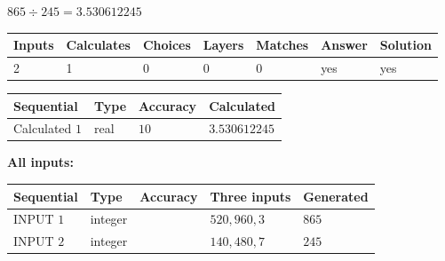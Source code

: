 \documentclass{ctexart}
\begin{document}
 

$ %
865 \div  %
245=   %
3.530612245$
 
 
\noindent{}
 
 

 
   
   
   
   
\noindent\begin{tabular}{|l|l|l|l|l|l|l|}
 \hline
Inputs & Calculates & Choices & Layers & Matches & Answer & Solution \\ \hline
 2  & 
 1  & 
 0
  & 
 0  & 
 0  & 
  yes & 
  yes 
  \\ \hline
 \end{tabular}
   
   
   
   
\noindent{}
   
   
  
  
\noindent\begin{tabular}{|l|l|l|l|}
\hline
 Sequential & Type & Accuracy & Calculated \\ 
\hline
 
 
  Calculated $  1 $ & real & $  10  $ & 
 $ 3.530612245 $ 
 \\  \hline  
 \end{tabular}
   
   
   
   
\noindent\vspace{0.1in}\hspace{-0.08in} {\textbf{\Large{All inputs: }}}
   
   
  
  
\noindent\begin{tabular}{|l|l|l|l|l|}
\hline
 Sequential & Type & Accuracy & Three inputs & Generated \\ 
\hline
 
 
  INPUT $  1 $ & integer &  & $
 520
 , 
 960
 , 
 3
 $ & $ 865 $ 
 \\  \hline  
 
 
  INPUT $  2 $ & integer &  & $
 140
 , 
 480
 , 
 7
 $ & $ 245 $ 
 \\  \hline  
 \end{tabular}
   
   
  
\vspace{0.2in}
  
\end{document}
